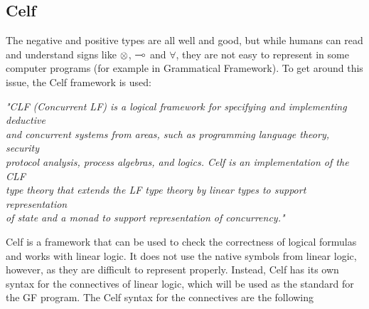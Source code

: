 
\subsection{Celf}
\label{03_01_03}

The negative and positive types are all well and good, but while humans can read and understand signs like $\otimes$, $\multimap$ and $\forall$, they are not easy to represent in some computer programs (for example in Grammatical Framework). To get around this issue, the Celf framework is used:

\begin{texto}
	\textit{"CLF (Concurrent LF) is a logical framework for specifying and implementing deductive \\
	and concurrent systems from areas, such as programming language theory, security \\
	protocol analysis, process algebras, and logics. Celf is an implementation of the CLF \\
	type theory that extends the LF type theory by linear types to support representation \\
	of state and a monad to support representation of concurrency."} \cite{Celf}
\end{texto}

Celf is a framework that can be used to check the correctness of logical formulas and works with linear logic. It does not use the native symbols from linear logic, however, as they are difficult to represent properly. Instead, Celf has its own syntax for the connectives of linear logic, which will be used as the standard for the GF program. The Celf syntax for the connectives are the following

